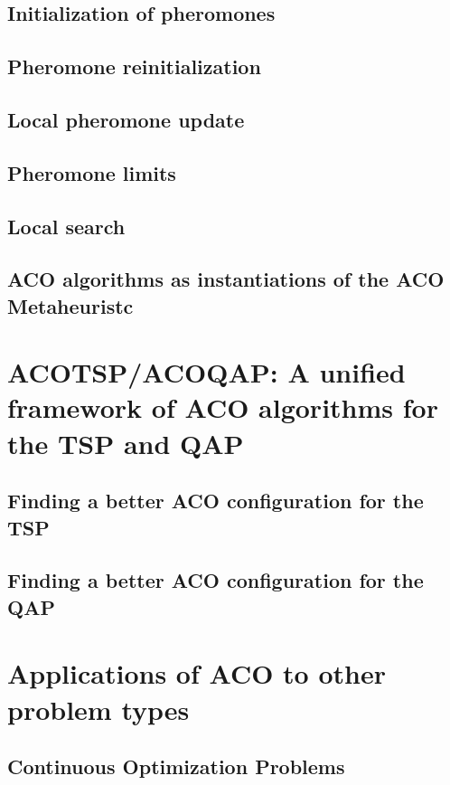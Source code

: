 \documentclass[12pt]{article}
\begin{document}
\subsection{Initialization of pheromones}

\subsection{Pheromone reinitialization}

\subsection{Local pheromone update}

\subsection{Pheromone limits}

\subsection{Local search}

\subsection{ACO algorithms as instantiations of the ACO Metaheuristc}

\section{ACOTSP/ACOQAP: A unified framework of ACO algorithms
for the TSP and QAP}

\subsection{Finding a better ACO configuration for the TSP}

\subsection{Finding a better ACO configuration for the QAP}

\section{Applications of ACO to other problem types}

\subsection{Continuous Optimization Problems}
\end{document}
